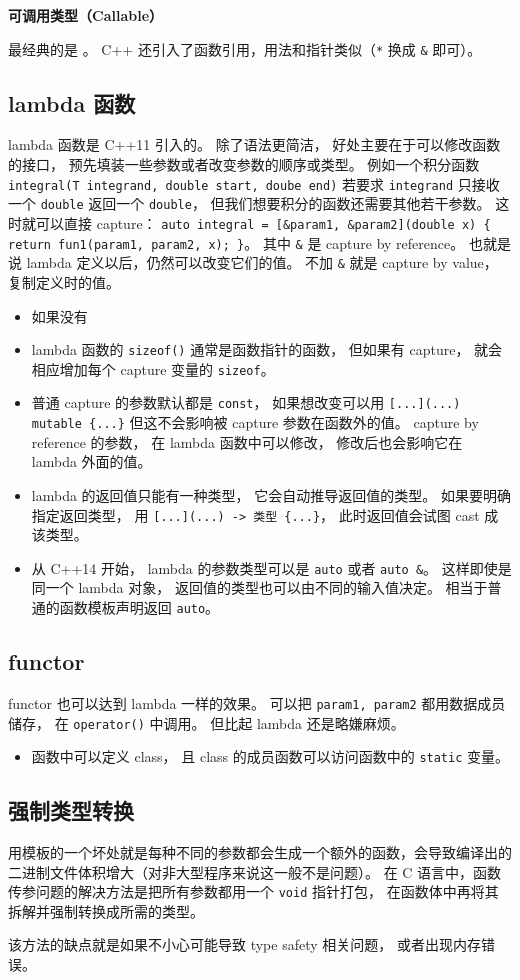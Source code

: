 

\textbf{可调用类型（Callable）}

最经典的是 。 C++ 还引入了函数引用，用法和指针类似（\verb`*` 换成 \verb`&` 即可）。

\subsection{lambda 函数}
lambda 函数是 C++11 引入的。 除了语法更简洁， 好处主要在于可以修改函数的接口， 预先填装一些参数或者改变参数的顺序或类型。 例如一个积分函数 \verb`integral(T integrand, double start, doube end)` 若要求 \verb`integrand` 只接收一个 \verb`double` 返回一个 \verb`double`， 但我们想要积分的函数还需要其他若干参数。 这时就可以直接 capture： \verb`auto integral = [&param1, &param2](double x) { return fun1(param1, param2, x); }`。 其中 \verb`&` 是 capture by reference。 也就是说 lambda 定义以后，仍然可以改变它们的值。 不加 \verb`&` 就是 capture by value， 复制定义时的值。

\begin{itemize}
\item 如果没有
\item lambda 函数的 \verb`sizeof()` 通常是函数指针的函数， 但如果有 capture， 就会相应增加每个 capture 变量的 \verb`sizeof`。
\item 普通 capture 的参数默认都是 \verb`const`， 如果想改变可以用 \verb`[...](...) mutable {...}` 但这不会影响被 capture 参数在函数外的值。 capture by reference 的参数， 在 lambda 函数中可以修改， 修改后也会影响它在 lambda 外面的值。
\item lambda 的返回值只能有一种类型， 它会自动推导返回值的类型。 如果要明确指定返回类型， 用 \verb`[...](...) -> 类型 {...}`， 此时返回值会试图 cast 成该类型。
\item 从 C++14 开始， lambda 的参数类型可以是 \verb`auto` 或者 \verb`auto &`。 这样即使是同一个 lambda 对象， 返回值的类型也可以由不同的输入值决定。 相当于普通的函数模板声明返回 \verb`auto`。
\end{itemize}

\subsection{functor}
functor 也可以达到 lambda 一样的效果。 可以把 \verb`param1, param2` 都用数据成员储存， 在 \verb`operator()` 中调用。 但比起 lambda 还是略嫌麻烦。

\begin{itemize}
\item 函数中可以定义 class， 且 class 的成员函数可以访问函数中的 \verb`static` 变量。
\end{itemize}

\subsection{强制类型转换}
用模板的一个坏处就是每种不同的参数都会生成一个额外的函数，会导致编译出的二进制文件体积增大（对非大型程序来说这一般不是问题）。 在 C 语言中，函数传参问题的解决方法是把所有参数都用一个 \verb`void` 指针打包， 在函数体中再将其拆解并强制转换成所需的类型。

该方法的缺点就是如果不小心可能导致 type safety 相关问题， 或者出现内存错误。
